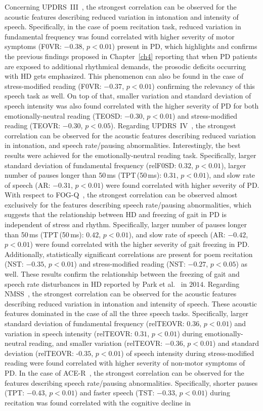 Concerning UPDRS~III~\cite{Fahn1987}, the strongest correlation can be observed for the acoustic features describing reduced variation in intonation and intensity of speech. Specifically, in the case of poem recitation task, reduced variation in fundamental frequency was found correlated with higher severity of motor symptoms (F0VR: $-0.38$, $p<0.01$) present in PD, which highlights and confirms the previous findings proposed in Chapter~\ref{ch4} reporting that when PD patients are exposed to additional rhythmical demands, the prosodic deficits occurring with HD gets emphasized. This phenomenon can also be found in the case of stress-modified reading (F0VR: $-0.37$, $p<0.01$) confirming the relevancy of this speech task as well. On top of that, smaller variation and standard deviation of speech intensity was also found correlated with the higher severity of PD for both emotionally-neutral reading (TEOSD: $-0.30$, $p<0.01$) and stress-modified reading (TEOVR: $-0.30$, $p<0.05$). Regarding UPDRS~IV~\cite{Fahn1987}, the strongest correlation can be observed for the acoustic features describing reduced variation in intonation, and speech rate/pausing abnormalities. Interestingly, the best results were achieved for the emotionally-neutral reading task. Specifically, larger standard deviation of fundamental frequency (relF0SD: $0.32$, $p<0.01$), larger number of pauses longer than 50\,ms (TPT\,(50\,ms): $0.31$, $p<0.01$), and slow rate of speech (AR: $-0.31$, $p<0.01$) were found correlated with higher severity of PD. With respect to FOG-Q~\cite{Giladi2000}, the strongest correlation can be observed almost exclusively for the features describing speech rate/pausing abnormalities, which suggests that the relationship between HD and freezing of gait in PD is independent of stress and rhythm. Specifically, larger number of pauses longer than 50\,ms (TPT\,(50\,ms): $0.42$, $p<0.01$), and slow rate of speech (AR: $-0.42$, $p<0.01$) were found correlated with the higher severity of gait freezing in PD. Additionally, statistically significant correlations are present for poem recitation (NST: $-0.35$, $p<0.01$) and stress-modified reading (NST: $-0.27$, $p<0.05$) as well. These results confirm the relationship between the freezing of gait and speech rate disturbances in HD reported by Park et al.~\cite{Park2014} in $2014$. Regarding NMSS~\cite{Chaudhuri2007}, the strongest correlation can be observed for the acoustic features describing reduced variation in intonation and intensity of speech. These acoustic features dominated in the case of all the three speech tasks. Specifically, larger standard deviation of fundamental frequency (relTEOVR: $0.36$, $p<0.01$) and variation in speech intensity (relTEOVR: $0.31$, $p<0.01$) during emotionally-neutral reading, and smaller variation (relTEOVR: $-0.36$, $p<0.01$) and standard deviation (relTEOVR: -$0.35$, $p<0.01$) of speech intensity during stress-modified reading were found correlated with higher severity of non-motor symptoms of PD. In the case of ACE-R~\cite{Larner2007}, the strongest correlation can be observed for the features describing speech rate/pausing abnormalities. Specifically, shorter pauses (TPT: $-0.43$, $p<0.01$) and faster speech (TST: $-0.33$, $p<0.01$) during recitation was found correlated with the cognitive decline in 